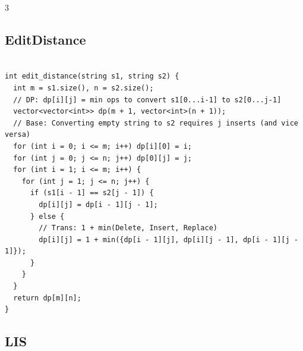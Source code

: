 \documentclass[10pt, landscape, a4paper, onesided]{extarticle}
\begin{document}
\begin{multicols*}{3}
\subsection{EditDistance}
\begin{verbatim}

int edit_distance(string s1, string s2) {
  int m = s1.size(), n = s2.size();
  // DP: dp[i][j] = min ops to convert s1[0...i-1] to s2[0...j-1]
  vector<vector<int>> dp(m + 1, vector<int>(n + 1));
  // Base: Converting empty string to s2 requires j inserts (and vice versa)
  for (int i = 0; i <= m; i++) dp[i][0] = i;
  for (int j = 0; j <= n; j++) dp[0][j] = j;
  for (int i = 1; i <= m; i++) {
    for (int j = 1; j <= n; j++) {
      if (s1[i - 1] == s2[j - 1]) {
        dp[i][j] = dp[i - 1][j - 1];
      } else {
        // Trans: 1 + min(Delete, Insert, Replace)
        dp[i][j] = 1 + min({dp[i - 1][j], dp[i][j - 1], dp[i - 1][j - 1]});
      }
    }
  }
  return dp[m][n];
}
\end{verbatim}

\subsection{LIS}
\begin{verbatim}


\end{verbatim}
\end{multicols*}
\end{document}
